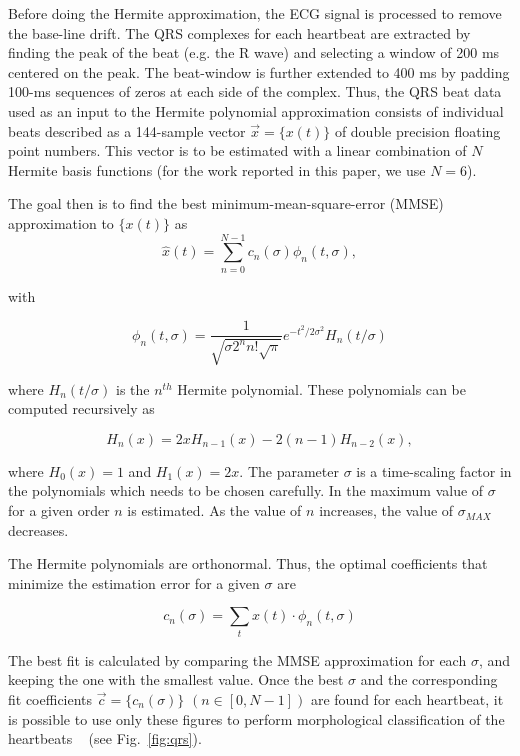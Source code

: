 \documentclass[conference]{IEEEtran}
\begin{document}
Before doing the Hermite approximation, the ECG signal is processed to remove
the base-line drift.  The QRS complexes for each heartbeat are extracted by 
finding the peak of the beat (e.g. the R wave) and selecting a  window of 200 ms centered on the peak. 
The beat-window is further extended to 400 ms by padding 100-ms sequences of zeros at each side of the complex. 
Thus, the QRS beat data used as an input to the Hermite polynomial approximation
consists of individual beats described as a 144-sample vector $\vec{x}=\{x(t)\}$ of double
precision floating point numbers. 
This vector is to be estimated with a linear combination of $N$ Hermite basis functions (for
the work reported in this paper, we use $N=6$).

The goal then is to find the best minimum-mean-square-error (MMSE)  approximation to
$\{ x(t)\}$ as 
\begin{equation}\label{eqn:hat}
\hat{x}(t)=\sum_{n=0}^{N-1}c_n(\sigma )\phi_n(t,\sigma),
\end{equation}

\noindent with

\begin{equation}\label{eqn:phi}
\phi_n(t,\sigma )=\frac{1}{\sqrt{\sigma 2^n n!\sqrt{\pi}}}e^{-t^2/2\sigma^2}H_n(t/\sigma) 
\end{equation}

\noindent where $H_n(t/\sigma)$ is the $n^{th}$ Hermite polynomial. 
These polynomials can be computed recursively as

\begin{equation}
H_n(x)=2xH_{n-1}(x)-2(n-1)H_{n-2}(x),
\end{equation}

\noindent where $H_0(x)=1$ and $H_1(x)=2x$.
The parameter $\sigma$ is a time-scaling factor in the polynomials which needs
to be chosen carefully.   In \cite{j:lagerholm00} the maximum value 
of $\sigma$ for a given order $n$ is estimated.  As the value of $n$ increases, the value of $\sigma_{MAX}$ decreases.

The Hermite polynomials are orthonormal.  Thus, the optimal coefficients that 
minimize the estimation error for a given $\sigma$ are

\begin{equation}\label{eqn:c}
c_n(\sigma)=\sum_{t} x(t)\cdot \phi_n(t,\sigma) 
\end{equation}

The best fit is calculated by comparing the MMSE approximation for each $\sigma$, and keeping
the one with the smallest value.
Once the best $\sigma$ and the corresponding fit coefficients $\vec{c}=\{c_n(\sigma)\}$  \mbox{$(n\in [0,N-1])$} 
are found for each heartbeat, it is possible to use only these figures to perform morphological 
classification of the heartbeats \textrm{~\cite{j:lagerholm00}} (see Fig.~\ref{fig:qrs}).
\end{document}
